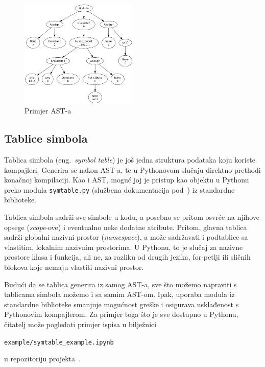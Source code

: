 \begin{figure}[hb]
    \centering
    \includegraphics[width=0.5\textwidth]{assets/ast-example.png}
    \caption{Primjer AST-a}
    \label{fig:ast-example}
\end{figure}

\subsection{Tablice simbola}
Tablica simbola (eng.\ \textsl{symbol table}) je još jedna struktura podataka koju koriste kompajleri. Generira se nakon AST-a, te u Pythonovom slučaju direktno prethodi konačnoj kompilaciji. Kao i AST, moguć joj
je pristup kao objektu u Pythonu preko modula \texttt{symtable.py} (službena dokumentacija pod~\cite{docs:symtable}) iz standardne biblioteke. 

Tablica simbola sadrži sve simbole u kodu, a posebno se pritom osvrće na njihove opsege (\emph{scope}-ove) i eventualno neke dodatne atribute. Pritom, glavna tablica sadrži globalni nazivni prostor (\emph{namespace}), 
a može sadržavati i podtablice sa vlastitim, lokalnim nazivnim prostorima. U Pythonu, to je slučaj za nazivne prostore klasa i funkcija, ali ne, za razliku od drugih jezika, for-petlji ili sličnih blokova koje nemaju vlastiti 
nazivni prostor.

Budući da se tablica generira iz samog AST-a, sve što možemo napraviti s tablicama simbola možemo i sa samim AST-om. Ipak, uporaba modula iz standardne biblioteke smanjuje mogućnost greške i osigurava usklađenost s
Pythonovim kompajlerom. Za primjer toga što je sve dostupno u Pythonu, čitatelj može pogledati primjer ispisa u bilježnici
\begin{center}
\texttt{example/symtable_example.ipynb}
\end{center}
u repozitoriju projekta~\cite{repo}.


